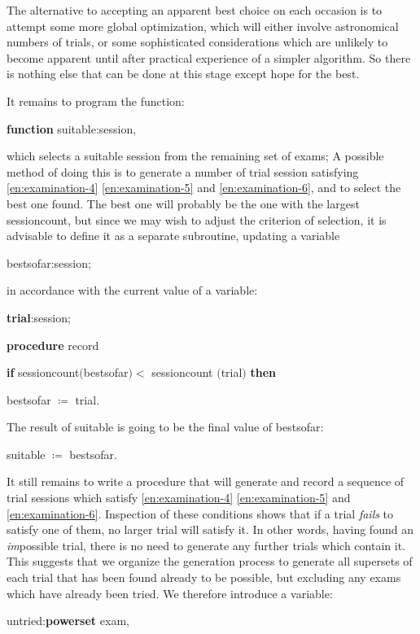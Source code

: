 The alternative to accepting an apparent best choice on each occasion is to attempt some more global optimization, which will either involve astronomical numbers of trials, or some sophisticated considerations which are unlikely to become apparent until after practical experience of a simpler algorithm. So there is nothing else that can be done at this stage except hope for the best.

It remains to program the function:

\quad \textbf{function} suitable:session,

\noindent
which selects a suitable session from the remaining set of exams; A possible method of doing this is to generate a number of trial session satisfying \ref{en:examination-4} \ref{en:examination-5} and \ref{en:examination-6}, and to select the best one found. The best one will probably be the one with the largest sessioncount, but since we may wish to adjust the criterion of selection, it is advisable to define it as a separate subroutine, updating a variable

\quad bestsofar:session;

\noindent
in accordance with the current value of a variable:

\quad \textbf{trial}:session;

\quad \textbf{procedure} record

\quad \quad \textbf{if} sessioncount$($bestsofar$) <$ sessioncount $($trial$)$ \textbf{then}

\quad \quad \quad bestsofar $\coloneq$ trial.

\noindent
The result of suitable is going to be the final value of bestsofar:

\quad suitable $\coloneq$ bestsofar.

It still remains to write a procedure that will generate and record a sequence of trial sessions which satisfy \ref{en:examination-4} \ref{en:examination-5} and \ref{en:examination-6}. Inspection of these conditions shows that if a trial \textit{fails} to satisfy one of them, no larger trial will satisfy it. In other words, having found an \textit{im}possible trial, there is no need to generate any further trials which contain it. This suggests that we organize the generation process to generate all supersets of each trial that has been found already to be possible, but excluding any exams which have already been tried. We therefore introduce a variable:

\quad untried:\textbf{powerset} exam,

